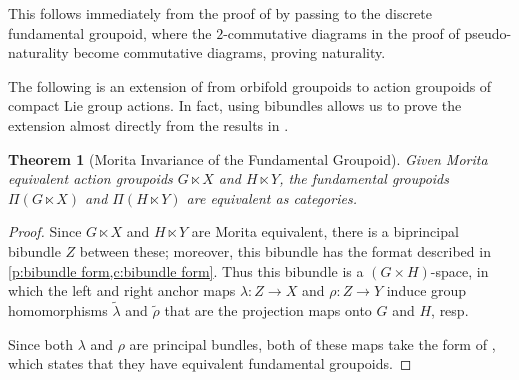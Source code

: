 \documentclass[12pt,reqno]{amsart}
\newcommand{\mute}[1]{}
\newcommand{\printname}[1]{}
\renewcommand{\printname}[1]
	{{\color{brown}{\makebox[0pt]{\hspace{-1in}\raisebox{8pt}{\tiny #1}}}}}
\newcommand{\labell}[1]{\label{#1} \printname{#1}}
\theoremstyle{plain}
\newtheorem{theorem}{Theorem}[section] %
\newtheorem{theorem}{Theorem} %
\theoremstyle{definition}
\begin{document}
    This follows immediately from the proof of \cite[Proposition 4.7]{PS:fund-gpd} by  passing  to the discrete fundamental groupoid, where  the $2$-commutative diagrams in the proof of pseudo-naturality become commutative diagrams, proving naturality.

\mute{
    \begin{proof}
        Given an arrow $\left[\overline{g},p\right]$ between $x_K$ and $y_L$ in $\Pi(G\ltimes X)$, we need to show that the following diagram is commutative:
        $$\xymatrix{
            \varphi(x)_{\widetilde{\varphi}(K)} \ar[rr]^{\left[\overline{\widetilde{\varphi}(g)},\,\varphi\circ p\right]} \ar[d]_{\left[\overline{\widetilde{S}(x)^{-1}},\,\varphi(x)\right]} & & \varphi(y)_{\widetilde{\varphi}(L)} \ar[d]^{\left[\overline{\widetilde{S}(y)^{-1}},\,\varphi(y)\right]} \\
            \psi(x)_{\widetilde{\psi}(K)} \ar[rr]_{\left[\overline{\widetilde{\psi}(g)},\,\psi\circ p\right]} & & \psi(y)_{\widetilde{\psi}(L)}. \\
        }$$
        That is, we need to show that the two compositions 
        $$\left[\overline{\widetilde{\varphi}(g)\widetilde{S}(y)^{-1}},\,\varphi\circ p\right]\quad \text{and} \quad \left[\overline{\widetilde{S}(x)^{-1}\widetilde{\psi}(g)},\,\widetilde{S}(x)^{-1}\psi\circ p\right]$$ are equal.  This is accomplished via the homotopies $$\Psi\colon H/\widetilde{\varphi}(K)\times[0,1]\to H/\widetilde{\psi}(L)\colon(\widetilde{\varphi}(aK),t)\mapsto a\widetilde{S}(p(t))^{-1}\widetilde{\psi}(g)\widetilde{\psi}(L)$$ and $$\Phi\colon[0,1]^2\to X\colon (s,t)\mapsto \widetilde{S}(p(st))^{-1}\psi\circ p(s)$$ as in \cref{d:fund-gpd}.
    \end{proof}
}
    The following is an extension of \cite[Theorem 5.1]{PS:fund-gpd} from orbifold groupoids to action groupoids of compact Lie group actions.  In fact, using bibundles allows us to prove the extension almost directly from the results in \cite{PS:fund-gpd}.

    \begin{theorem}[Morita Invariance of the Fundamental Groupoid]\labell{t:fund gpd morita}
        Given Morita equivalent action groupoids $G\ltimes X$ and $H\ltimes Y$, the fundamental groupoids $\Pi(G\ltimes X)$ and $\Pi(H\ltimes Y)$ are equivalent as categories.
    \end{theorem}

    \begin{proof}
        Since $G\ltimes X$ and $H\ltimes Y$ are Morita equivalent, there is a biprincipal bibundle $Z$ between these; moreover, this bibundle has the format described in \cref{p:bibundle form,c:bibundle form}.  Thus this bibundle is a $(G\times H)$-space, in which the left and right anchor maps $\lambda\colon Z\to X$ and $\rho\colon Z\to Y$ induce group homomorphisms $\widetilde{\lambda}$ and $\widetilde{\rho}$ that are the projection maps onto $G$ and $H$, resp. 

        Since both $\lambda$ and $\rho$ are principal bundles, both of these maps take the form of \cite[Proposition 5.6]{PS:fund-gpd}, which states that they have equivalent fundamental groupoids. 
    \end{proof}
\end{document}
